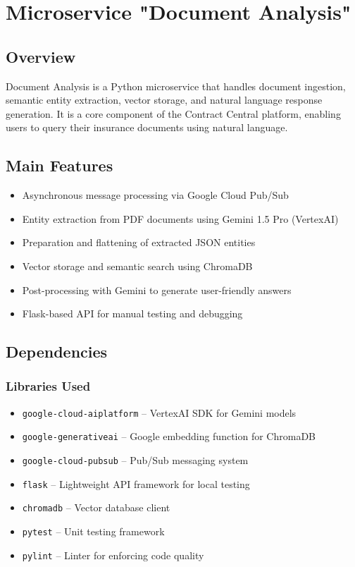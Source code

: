 \chapter{Microservice "Document Analysis"}

\section{Overview}
Document Analysis is a Python microservice that handles document ingestion, semantic entity extraction, vector storage, and natural language response generation. It is a core component of the Contract Central platform, enabling users to query their insurance documents using natural language.

\section{Main Features}
\begin{itemize}
    \item Asynchronous message processing via Google Cloud Pub/Sub
    \item Entity extraction from PDF documents using Gemini 1.5 Pro (VertexAI)
    \item Preparation and flattening of extracted JSON entities
    \item Vector storage and semantic search using ChromaDB
    \item Post-processing with Gemini to generate user-friendly answers
    \item Flask-based API for manual testing and debugging
\end{itemize}

\section{Dependencies}

\subsection{Libraries Used}
\begin{itemize}
    \item \texttt{google-cloud-aiplatform} -- VertexAI SDK for Gemini models
    \item \texttt{google-generativeai} -- Google embedding function for ChromaDB
    \item \texttt{google-cloud-pubsub} -- Pub/Sub messaging system
    \item \texttt{flask} -- Lightweight API framework for local testing
    \item \texttt{chromadb} -- Vector database client
    \item \texttt{pytest} -- Unit testing framework
    \item \texttt{pylint} -- Linter for enforcing code quality
\end{itemize}

